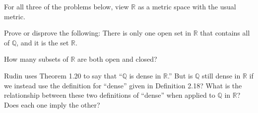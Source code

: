 \documentclass[12pt,letterpaper,boxed,cm]{hmcpset}
\newcommand{\R}[0]{\mathbb{R}}
\newcommand{\Q}[0]{\mathbb{Q}}
\begin{document}
For all three of the problems below, view $\R$ as a metric space with the usual metric.\\
\begin{problem}[(1)]
    Prove or disprove the following: There is only one open set in $\R$ that contains all of
    $\Q$, and it is the set $\R$.
\end{problem}

\begin{solution}
    \vfill
\end{solution}
\newpage

\begin{problem}[(2)]
    How many subsets of $\R$ are both open and closed?
\end{problem}

\begin{solution}
    \vfill
\end{solution}
\newpage

\begin{problem}[(3)]
    Rudin uses Theorem 1.20 to say that ``$\Q$ is dense in $\R$.'' But is $\Q$ still dense in $\R$
    if we instead use the definition for ``dense'' given in Definition 2.18? What is the
    relationship between these two definitions of ``dense'' when applied to $\Q$ in $\R$? Does
    each one imply the other?
\end{problem}

\begin{solution}
    \vfill
\end{solution}
\newpage
\end{document}
